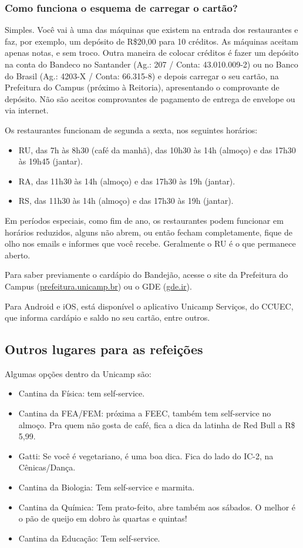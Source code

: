 \subsubsection{Como funciona o esquema de carregar o cartão?}

Simples. Você vai à uma das máquinas que existem na entrada dos restaurantes e
faz, por exemplo, um depósito de R\$20,00 para 10 créditos. As máquinas aceitam
apenas notas, e sem troco. Outra maneira de colocar créditos é fazer um depósito
na conta do Bandeco no Santander (Ag.: 207 / Conta: 43.010.009-2) ou no Banco do
Brasil (Ag.: 4203-X / Conta: 66.315-8) e depois carregar o seu cartão, na
Prefeitura do Campus (próximo à Reitoria), apresentando o comprovante de
depósito. Não são aceitos comprovantes de pagamento de entrega de envelope ou
via internet.

Os restaurantes funcionam de segunda a sexta, nos seguintes horários:

\begin{itemize}
\item RU, das 7h às 8h30 (café da manhã), das 10h30 às 14h (almoço) e das 17h30
 às 19h45 (jantar).
\item RA, das 11h30 às 14h (almoço) e das 17h30 às 19h (jantar).
\item RS, das 11h30 às 14h (almoço) e das 17h30 às 19h (jantar).
\end{itemize}

Em períodos especiais, como fim de ano, os restaurantes podem funcionar em
horários reduzidos, alguns não abrem, ou então fecham completamente, fique de
olho nos emails e informes que você recebe. Geralmente o RU é o que permanece
aberto.

Para saber previamente o cardápio do Bandejão, acesse o site da Prefeitura do
Campus (\url{prefeitura.unicamp.br}) ou o GDE (\url{gde.ir}).

Para Android e iOS, está disponível o aplicativo Unicamp Serviços, do CCUEC, que
informa cardápio e saldo no seu cartão, entre outros.

\subsection{Outros lugares para as refeições}

Algumas opções dentro da Unicamp são:

\begin{itemize}
\item Cantina da Física: tem self-service.
\item Cantina da FEA/FEM: próxima a FEEC, também tem self-service no almoço. Pra
  quem não gosta de café, fica a dica da latinha de Red Bull a R\$ 5,99.
\item Gatti: Se você é vegetariano, é uma boa dica. Fica do lado do IC-2, na
  Cênicas/Dança.
\item Cantina da Biologia: Tem self-service e marmita.
\item Cantina da Química:  Tem prato-feito, abre também aos sábados. O melhor é
  o pão de queijo em dobro às quartas e quintas!
\item Cantina da Educação: Tem self-service.
\end {itemize}

